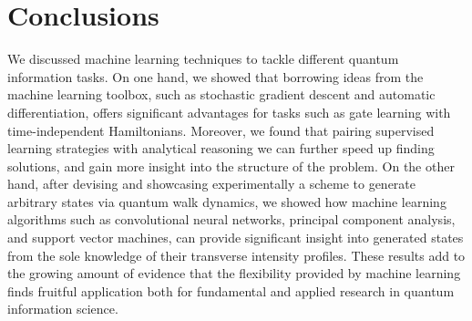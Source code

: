 \documentclass[12pt,twoside]{report}
\begin{document}


% 

% 

% 

% 

% 

\chapter{Conclusions}
We discussed machine learning techniques to tackle different quantum information tasks.
On one hand, we showed that borrowing ideas from the machine learning toolbox, such as stochastic gradient descent and automatic differentiation, offers significant advantages for tasks such as gate learning with time-independent Hamiltonians.
Moreover, we found that pairing supervised learning strategies with analytical reasoning we can further speed up finding solutions, and gain more insight into the structure of the problem.
On the other hand, after devising and showcasing experimentally a scheme to generate arbitrary states via quantum walk dynamics, we showed how machine learning algorithms such as convolutional neural networks, principal component analysis, and support vector machines, can provide significant insight into generated states from the sole knowledge of their transverse intensity profiles.
These results add to the growing amount of evidence that the flexibility provided by machine learning finds fruitful application both for fundamental and applied research in quantum information science.



\end{document}
